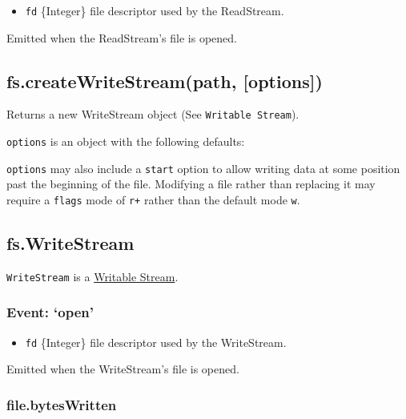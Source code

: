 \begin{itemize}
\item
  \texttt{fd} \{Integer\} file descriptor used by the ReadStream.
\end{itemize}

Emitted when the ReadStream's file is opened.

\subsection{fs.createWriteStream(path, {[}options{]})}

Returns a new WriteStream object (See \texttt{Writable Stream}).

\texttt{options} is an object with the following defaults:

\begin{Shaded}
\begin{Highlighting}[]
\NormalTok{\{ }\NormalTok{: }\NormalTok{,}
  \NormalTok{: } \NormalTok{\}}
\end{Highlighting}
\end{Shaded}

\texttt{options} may also include a \texttt{start} option to allow
writing data at some position past the beginning of the file. Modifying
a file rather than replacing it may require a \texttt{flags} mode of
\texttt{r+} rather than the default mode \texttt{w}.

\subsection{fs.WriteStream}

\texttt{WriteStream} is a
\href{stream.html\#stream\_writable\_stream}{Writable Stream}.

\subsubsection{Event: `open'}

\begin{itemize}
\item
  \texttt{fd} \{Integer\} file descriptor used by the WriteStream.
\end{itemize}

Emitted when the WriteStream's file is opened.

\subsubsection{file.bytesWritten}

